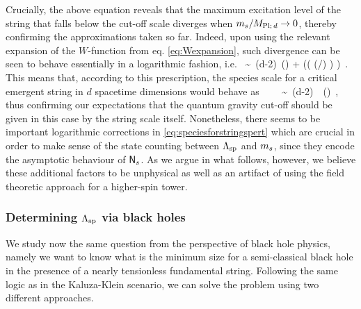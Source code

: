 Crucially, the above equation reveals that the maximum excitation level of the string that falls below the cut-off scale diverges when $m_s/M_{\text{Pl;}\, d} \to 0$, thereby confirming the approximations taken so far. Indeed, upon using the relevant expansion of the $W$-function from eq. \eqref{eq:Wexpansion}, such divergence can be seen to behave essentially in a logarithmic fashion, i.e.
%
\beq
	\sqrt{\Ns}\, \sim\, (d-2)\, \log \left(\dfrac{\Mpd}{\Ms}\right) + \left(\log \left( \log (\Mpd/\Ms) \right) \right)\, .
\eeq
%
This means that, according to this prescription, the species scale for a critical emergent string in $d$ spacetime dimensions would behave as  
%
\beq\label{eq:speciesforstringspert}
	\frac{\LSP}{\Mpd}\, \simeq\, \sqrt{\Ns}\, \frac{\Ms}{\Mpd}\, \sim\,  (d-2)\,  \dfrac{\Ms}{\Mpd}\  \log \left(\dfrac{\Mpd}{\Ms}\right)\, ,
\eeq
%
thus confirming our expectations that the quantum gravity cut-off should be given in this case by the string scale itself. Nonetheless, there seems to be important logarithmic corrections in \eqref{eq:speciesforstringspert} which are crucial in order to make sense of the state counting between $\Lambda_{\text{sp}}$ and $m_s$, since they encode the asymptotic behaviour of $\mathsf{N}_s$. As we argue in what follows, however, we believe these additional factors to be unphysical as well as an artifact of using the field theoretic approach for a higher-spin tower.

\subsubsection*{Determining $\Lambda_{\text{sp}}$ via black holes}

We study now the same question from the perspective of black hole physics, namely we want to know what is the minimum size for a semi-classical black hole in the presence of a nearly tensionless fundamental string. Following the same logic as in the Kaluza-Klein scenario, we can solve the problem using two different approaches.

